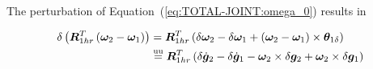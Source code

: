 \documentclass[10pt,dvips,fleqn,subeqn]{report}
\newcommand{\T}[1]{\bm{#1}}
\newcommand{\TT}[1]{\bm{#1}}
\newcommand{\equu}{\overset{\text{uu}}{=}}
\begin{document}
The perturbation of Equation~(\ref{eq:TOTAL-JOINT:omega_0}) results in
\begin{comment}
\begin{align}
	\delta\T{\omega}^{\delta}
	&= \T{R}_{1hr}^T \plbr{
		\delta\T{\omega}_2
		- \delta\T{\omega}_1
		+ \plbr{\T{\omega}_2 - \T{\omega}_1}\times\T{\theta}_{1\delta}
	} - \T{\theta}_{\delta}^{\delta}\times\T{R}^{\delta}\T{\omega}_0 \nonumber \\
	&= \T{R}_{1hr}^T \plbr{
		\delta\T{\omega}_2
		- \delta\T{\omega}_1
		+ \plbr{\T{\omega}_2 - \T{\omega}_1}\times\T{\theta}_{1\delta}
	} \nonumber \\
	& \mbox{\hspace{12pt}}
	+ \plbr{\T{R}^{\delta}\T{\omega}_0}\times \T{R}_{1hr}^T \plbr{
		\T{\theta}_{2\delta}
		- \T{\theta}_{1\delta}
	} \nonumber \\
	&= \T{R}_{1hr}^T \plbr{
		\delta\T{\omega}_2
		- \delta\T{\omega}_1
	} + \plbr{\T{R}^{\delta}\T{\omega}_0}\times \T{R}_{1hr}^T \T{\theta}_{2\delta}
	\nonumber \\
	& \mbox{\hspace{12pt}}
	+ \plbr{
		\T{R}_{1hr}^T \plbr{\T{\omega}_2 - \T{\omega}_1}\times{}
		- \plbr{\T{R}^{\delta}\T{\omega}_0}\times \T{R}_{1hr}^T
	} \T{\theta}_{1\delta}
	\nonumber \\
	&= \T{R}_{1hr}^T \plbr{
		\delta\T{\omega}_2
		- \delta\T{\omega}_1
	} + \plbr{\T{R}^{\delta}\T{\omega}_0}\times \T{R}_{1hr}^T \T{\theta}_{2\delta}
	+ \T{\omega}^{\delta} \times \T{R}_{1hr}^T \T{\theta}_{1\delta} .
\end{align}
After applying the updated-updated approximations, it becomes
\begin{align}
	\delta\T{\omega}^{\delta}
	&\equu
	\T{R}_{1hr}^T \delta\dot{\T{g}}_2
	-
	\T{R}_{1hr}^T \delta\dot{\T{g}}_1
	-
	\plbr{
		\T{R}_{1hr}^T \T{\omega}_2\times{}
		-
		\T{\omega}_0\times\T{R}_{1hr}^T
	} \delta\T{g}_2
	+
	\T{R}_{1hr}^T \T{\omega}_1\times \delta\T{g}_1
	.
\end{align}
\end{comment}
\begin{align}
	\delta\plbr{
		\TT{R}_{1hr}^T \plbr{
			\T{\omega}_2 - \T{\omega}_1
		}
	}
	&=
	\TT{R}_{1hr}^T \plbr{
		\delta \T{\omega}_2
		-
		\delta \T{\omega}_1
		+
		\plbr{
			\T{\omega}_2 - \T{\omega}_1
		} \times \T{\theta}_{1\delta}
	}
	\nonumber \\
	&\equu
	\TT{R}_{1hr}^T \plbr{
		\delta\dot{\T{g}}_2
		-
		\delta\dot{\T{g}}_1
		-
		\T{\omega}_2 \times \delta\T{g}_2
		+
		\T{\omega}_2 \times \delta\T{g}_1
	}
\end{align}
\end{document}
